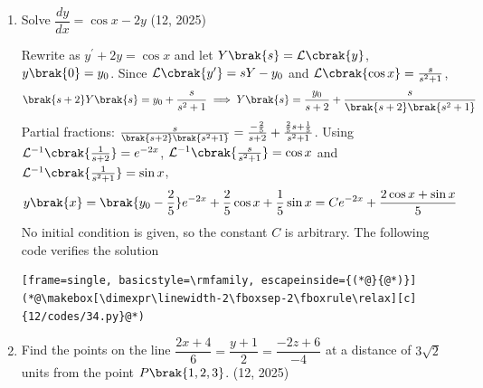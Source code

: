 \begin{enumerate}[label=\thesubsection.\arabic*, ref=\thesubsection.\theenumi]
\item
Solve $\dfrac{dy}{dx} = \cos x - 2y$
\hfill (12, 2025)

\solution
Rewrite as $y^{\prime} + 2y = \cos x$ and let $Y\brak{s} = \mathcal{L}\cbrak{y}$, $y\brak{0} = y_0$. Since $\mathcal{L}\cbrak{y^{\prime}} = sY - y_0$ and $\mathcal{L}\cbrak{\cos x} = \frac{s}{s^2+1}$,
\begin{align}
	\brak{s+2}Y\brak{s} = y_0 + \frac{s}{s^2+1} \implies Y\brak{s} = \frac{y_0}{s+2} + \frac{s}{\brak{s+2}\brak{s^2+1}}
\end{align}
Partial fractions: $\frac{s}{\brak{s+2}\brak{s^2+1}} = \frac{-\frac{2}{5}}{s+2} + \frac{\frac{2}{5}s + \frac{1}{5}}{s^2+1}$. Using $\mathcal{L}^{-1}\cbrak{\frac{1}{s+2}} = e^{-2x}$, $\mathcal{L}^{-1}\cbrak{\frac{s}{s^2+1}} = \cos x$ and $\mathcal{L}^{-1}\cbrak{\frac{1}{s^2+1}} = \sin x$,
\begin{align}
	y\brak{x} = \brak{y_0 - \frac{2}{5}}e^{-2x} + \frac{2}{5}\cos x + \frac{1}{5}\sin x = Ce^{-2x} + \frac{2\cos x + \sin x}{5}
\end{align}
No initial condition is given, so the constant $C$ is arbitrary. The following code verifies the solution
\begin{lstlisting}[frame=single, basicstyle=\rmfamily, escapeinside={(*@}{@*)}]
(*@\makebox[\dimexpr\linewidth-2\fboxsep-2\fboxrule\relax][c]{12/codes/34.py}@*)
\end{lstlisting}

\item
Find the points on the line $\dfrac{2x+4}{6} = \dfrac{y+1}{2} = \dfrac{-2z+6}{-4}$ at a distance of $3\sqrt{2}$ units from the point $P\brak{1,2,3}$.
\hfill (12, 2025)


\end{enumerate}
